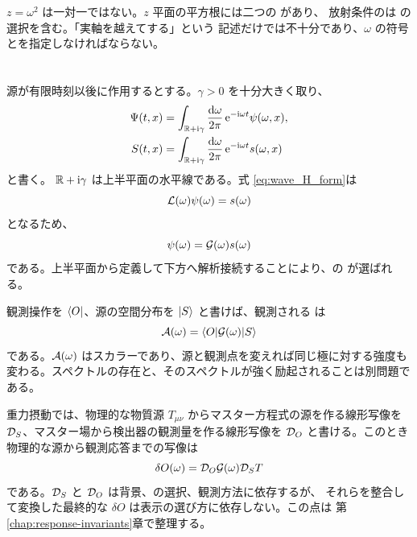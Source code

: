 \begin{warningbox}
$z=\omega^2$ は一対一ではない。$z$ 平面の平方根には二つの  があり、
放射条件のは  の選択を含む。「実軸を越えてする」という
記述だけでは不十分であり、$\omega$ の符号とを指定しなければならない。
\end{warningbox}

\section{}

源が有限時刻以後に作用するとする。$\gamma>0$ を十分大きく取り、
\begin{align}
\Psi(t,x)
&=
\int_{\mathbb{R}+\mathrm{i}\gamma}
\frac{\mathrm{d}\omega}{2\pi}
\,
\mathrm{e}^{-\mathrm{i}\omega t}
\psi(\omega,x),
\label{eq:inverse_laplace_psi}
\\
S(t,x)
&=
\int_{\mathbb{R}+\mathrm{i}\gamma}
\frac{\mathrm{d}\omega}{2\pi}
\,
\mathrm{e}^{-\mathrm{i}\omega t}
s(\omega,x)
\label{eq:inverse_laplace_source}
\end{align}
と書く。 $\mathbb{R}+\mathrm{i}\gamma$ は上半平面の水平線である。式
\eqref{eq:wave_H_form}は
\begin{equation}
\mathcal{L}(\omega)\psi(\omega)
=
s(\omega)
\end{equation}
となるため、
\begin{equation}
\psi(\omega)
=
\mathcal{G}(\omega)s(\omega)
\label{eq:frequency_response}
\end{equation}
である。上半平面から定義して下方へ解析接続することにより、の
が選ばれる。

観測操作を $\langle O \rvert$、源の空間分布を $\lvert S \rangle$ と書けば、観測される
は
\begin{equation}
\mathcal{A}(\omega)
=
\langle O \rvert\mathcal{G}(\omega)\lvert S \rangle
\label{eq:source_observer_amplitude}
\end{equation}
である。$\mathcal{A}(\omega)$ はスカラーであり、源と観測点を変えれば同じ極に対する強度も
変わる。スペクトルの存在と、そのスペクトルが強く励起されることは別問題である。

重力摂動では、物理的な物質源 $T_{\mu\nu}$ からマスター方程式の源を作る線形写像を
$\mathcal{D}_S$、マスター場から検出器の観測量を作る線形写像を $\mathcal{D}_O$ と書ける。このとき
物理的な源から観測応答までの写像は
\begin{equation}
\delta O(\omega)
=
\mathcal{D}_O\mathcal{G}(\omega)\mathcal{D}_S T
\label{eq:physical-response-map}
\end{equation}
である。$\mathcal{D}_S$ と $\mathcal{D}_O$ は背景、の選択、観測方法に依存するが、
それらを整合して変換した最終的な $\delta O$ は表示の選び方に依存しない。この点は
第\ref{chap:response-invariants}章で整理する。

